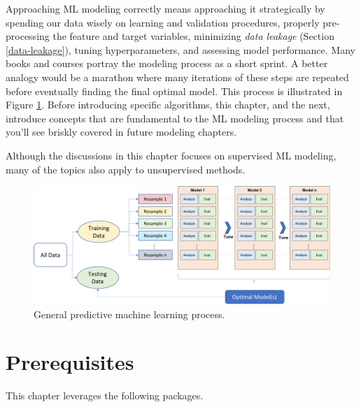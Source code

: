 \documentclass[]{krantz}
\makeatletter
\newenvironment{kframe}{%
\medskip{}
\setlength{\fboxsep}{.8em}
 \def\at@end@of@kframe{}%
 \ifinner\ifhmode%
  \def\at@end@of@kframe{\end{minipage}}%
  \begin{minipage}{\columnwidth}%
 \fi\fi%
 \def\FrameCommand##1{\hskip\@totalleftmargin \hskip-\fboxsep
 \colorbox{shadecolor}{##1}\hskip-\fboxsep
     \hskip-\linewidth \hskip-\@totalleftmargin \hskip\columnwidth}%
 \MakeFramed {\advance\hsize-\width
   \@totalleftmargin\z@ \linewidth\hsize
   \@setminipage}}%
 {\par\unskip\endMakeFramed%
 \at@end@of@kframe}
\newenvironment{block}[1]
  {
  \begin{itemize}
  \renewcommand{\labelitemi}{
    \raisebox{-.7\height}[0pt][0pt]{
      {\setkeys{Gin}{width=3em,keepaspectratio}\texttt{[image: icons/\#1]}}
    }
  }
  \setlength{\fboxsep}{1em}
  \begin{kframe}
  \item
  }
  {
  \end{kframe}
  \end{itemize}
  }
\newenvironment{note}
  {\begin{block}{note}}
  {\end{block}}
\makeatother
\begin{document}
Approaching ML modeling correctly means approaching it strategically by spending our data wisely on learning and validation procedures, properly pre-processing the feature and target variables, minimizing \emph{data leakage} (Section \ref{data-leakage}), tuning hyperparameters, and assessing model performance. Many books and courses portray the modeling process as a short sprint. A better analogy would be a marathon where many iterations of these steps are repeated before eventually finding the final optimal model. This process is illustrated in Figure \ref{fig:02-modeling-process}. Before introducing specific algorithms, this chapter, and the next, introduce concepts that are fundamental to the ML modeling process and that you'll see briskly covered in future modeling chapters.

\begin{note}
Although the discussions in this chapter focuses on supervised ML
modeling, many of the topics also apply to unsupervised methods.
\end{note}

\begin{figure}

{\centering \includegraphics[width=0.9\linewidth,height=0.9\textheight]{images/modeling_process} 

}

\caption{General predictive machine learning process.}\label{fig:02-modeling-process}
\end{figure}

\hypertarget{prerequisites}{%
\section{Prerequisites}\label{prerequisites}}

This chapter leverages the following packages.
\end{document}

